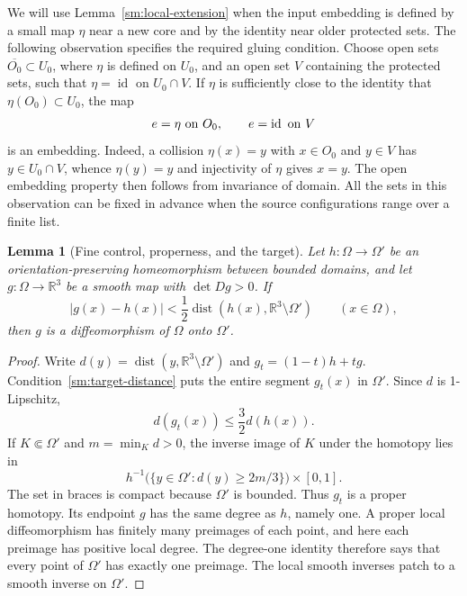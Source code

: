 \documentclass[11pt]{article}
\numberwithin{equation}{section}
\newtheorem{lemma}[theorem]{Lemma}
\theoremstyle{definition}
\theoremstyle{remark}
\newcommand{\R}{\mathbb R}
\newcommand{\Id}{\operatorname{id}}
\DeclareMathOperator{\dist}{dist}
\begin{document}
We will use Lemma~\ref{sm:local-extension} when the input embedding is
defined by a small map $\eta$ near a new core and by the identity near
older protected sets.  The following observation specifies the required
gluing condition.  Choose open sets
$\overline{O_0}\subset U_0$, where $\eta$ is defined on $U_0$, and
an open set $V$ containing the protected sets, such that
$\eta=\Id$ on $U_0\cap V$.  If $\eta$ is sufficiently close to
the identity that $\eta(O_0)\subset U_0$, the map
\begin{equation}
 \label{sm:patched-embedding}
 e=\eta\ \hbox{on }O_0,\qquad e=\Id\ \hbox{on }V
\end{equation}
is an embedding.  Indeed, a collision $\eta(x)=y$ with
$x\in O_0$ and $y\in V$ has $y\in U_0\cap V$, whence
$\eta(y)=y$ and injectivity of $\eta$ gives $x=y$.  The open
embedding property then follows from invariance of domain.  All the
sets in this observation can be fixed in advance when the source
configurations range over a finite list.

\begin{lemma}[Fine control, properness, and the target]
\label{sm:proper-degree}
Let $h:\Omega\to\Omega'$ be an orientation-preserving homeomorphism
between bounded domains, and let $g:\Omega\to\R^3$ be a smooth
map with $\det Dg>0$.  If
\begin{equation}
 \label{sm:target-distance}
 |g(x)-h(x)|<\frac12\dist(h(x),\R^3\setminus\Omega')
 \qquad(x\in\Omega),
\end{equation}
then $g$ is a diffeomorphism of $\Omega$ onto $\Omega'$.
\end{lemma}

\begin{proof}
Write $d(y)=\dist(y,\R^3\setminus\Omega')$ and
$g_t=(1-t)h+tg$.  Condition~\eqref{sm:target-distance} puts the entire
segment $g_t(x)$ in $\Omega'$.  Since $d$ is 1-Lipschitz,
\[
 d(g_t(x))\le\frac32d(h(x)).
\]
If $K\Subset\Omega'$ and $m=\min_Kd>0$, the inverse image of $K$
under the homotopy lies in
\[
 h^{-1}\bigl(\{y\in\Omega':d(y)\ge2m/3\}\bigr)\times[0,1].
\]
The set in braces is compact because $\Omega'$ is bounded.
Thus $g_t$ is a proper homotopy.  Its endpoint $g$ has the same
degree as $h$, namely one.  A proper local diffeomorphism has
finitely many preimages of each point, and here each preimage has
positive local degree.  The degree-one identity therefore says that
every point of $\Omega'$ has exactly one preimage.  The local smooth
inverses patch to a smooth inverse on $\Omega'$.
\end{proof}
\end{document}
